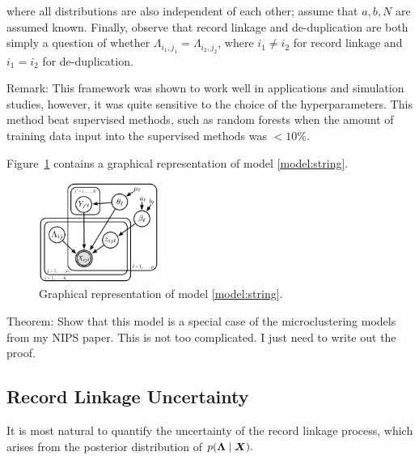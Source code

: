 \documentclass[twoside]{article}
\begin{document}
where all distributions are also independent of each other; assume that $a,b, N$ are assumed known. Finally, observe that record linkage and de-duplication are both simply a question of whether $\Lambda_{i_1,j_1}=\Lambda_{i_2,j_2}$, where $i_1\ne i_2$ for record linkage and $i_1=i_2$ for de-duplication. 


Remark: This framework was shown to work well in applications and simulation studies, however, it was quite sensitive to the choice of the hyperparameters. This method  beat supervised methods, such as random forests when the amount of training data input into the supervised methods was $< 10\%$. 

Figure~\ref{fig:graphicalProcess} contains a graphical representation of model \ref{model:string}.

\begin{figure}[htbp]
\begin{center}
\includegraphics[width=0.35\textwidth]{figures/recordLinkage_graphicalModel}
\caption{Graphical representation of model \ref{model:string}.}
\label{fig:graphicalProcess}
\end{center}
\end{figure}

Theorem: Show that this model is a special case of the microclustering models from my NIPS paper. This is not too complicated. I just need to write out the proof. 


\subsection{Record Linkage Uncertainty} 
It is most natural to quantify the uncertainty of the record linkage process, which arises from the posterior distribution of $p(\boldsymbol{\Lambda} \mid \bm{X}).$ 
\end{document}

